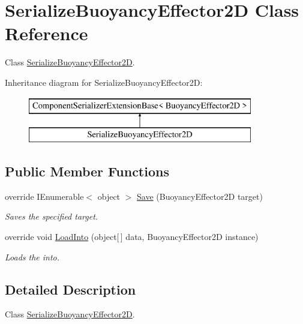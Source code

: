\hypertarget{class_serialize_buoyancy_effector2_d}{}\section{Serialize\+Buoyancy\+Effector2D Class Reference}
\label{class_serialize_buoyancy_effector2_d}


Class \hyperlink{class_serialize_buoyancy_effector2_d}{Serialize\+Buoyancy\+Effector2D}.  


Inheritance diagram for Serialize\+Buoyancy\+Effector2D\+:\begin{figure}[H]
\begin{center}
\leavevmode
\includegraphics[height=2.000000cm]{class_serialize_buoyancy_effector2_d}
\end{center}
\end{figure}
\subsection*{Public Member Functions}
\begin{DoxyCompactItemize}
\item 
override I\+Enumerable$<$ object $>$ \hyperlink{class_serialize_buoyancy_effector2_d_ae962d6acb99692dc665c8c87b52bd6c1}{Save} (Buoyancy\+Effector2D target)
\begin{DoxyCompactList}\small\item\em Saves the specified target. \end{DoxyCompactList}\item 
override void \hyperlink{class_serialize_buoyancy_effector2_d_a62d9b2d56f69620c38994d026c8b479f}{Load\+Into} (object\mbox{[}$\,$\mbox{]} data, Buoyancy\+Effector2D instance)
\begin{DoxyCompactList}\small\item\em Loads the into. \end{DoxyCompactList}\end{DoxyCompactItemize}


\subsection{Detailed Description}
Class \hyperlink{class_serialize_buoyancy_effector2_d}{Serialize\+Buoyancy\+Effector2D}. 



